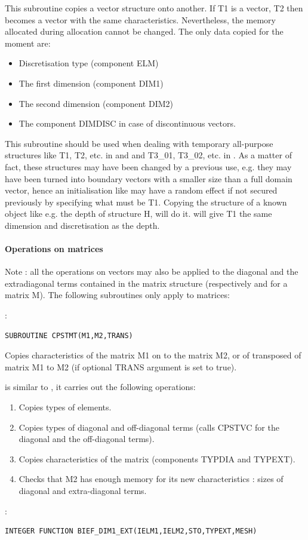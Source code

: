 This subroutine copies a vector structure onto another. If  T1 is a vector, T2
then becomes a vector with the same characteristics. Nevertheless, the memory
allocated during allocation cannot be changed. The only data copied for the
moment are:
\begin{itemize}
  \item Discretisation type (component ELM)
  \item The first dimension (component DIM1)
  \item The second dimension (component DIM2)
  \item The component DIMDISC in case of discontinuous vectors.
\end{itemize}

This subroutine should be used when dealing with temporary all-purpose
 structures like T1, T2, etc. in  and \sisyphe
and T3\_01, T3\_02, etc. in . As a matter of fact, these structures
may have been changed by a previous use, e.g. they may have been turned into
boundary vectors with a smaller size than a full domain vector, hence an
initialisation like  may have a random effect
if not secured previously by specifying what must be T1. Copying the structure
of a known object like e.g.  the depth of structure H, will do it.  will give T1 the same dimension and discretisation as the depth.

\paragraph{Operations on matrices}

Note : all the operations on vectors may also be applied to the diagonal and
the extradiagonal terms contained in the matrix structure (respectively
 and  for a matrix M). The following subroutines only
 apply to matrices:

:
\begin{lstlisting}[language=TelFortran]
SUBROUTINE CPSTMT(M1,M2,TRANS)
\end{lstlisting}

Copies characteristics of the matrix M1 on to the matrix M2, or of transposed
of matrix M1 to M2 (if optional TRANS argument is set to true).

 is similar to , it carries out the following
operations:
\begin{enumerate}
  \item Copies types of elements.
  \item Copies types of diagonal and off-diagonal terms (calls CPSTVC for the
    diagonal and the off-diagonal terms).
  \item Copies characteristics of the matrix (components TYPDIA and TYPEXT).
  \item Checks that M2 has enough memory for its new characteristics : sizes of
    diagonal and extra-diagonal terms.
\end{enumerate}
:
\begin{lstlisting}[language=TelFortran]
INTEGER FUNCTION BIEF_DIM1_EXT(IELM1,IELM2,STO,TYPEXT,MESH)
\end{lstlisting}

